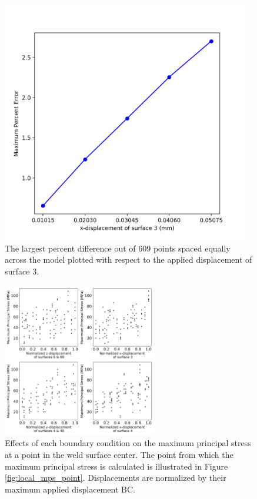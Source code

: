 \begin{figure}[h!]
\centering
\includegraphics[width=0.65\textheight,height=300pt,keepaspectratio]{nl_sload_error.png}
\caption{The largest percent difference out of 609 points spaced equally across
the model plotted with respect to the applied displacement of surface 3.}
\label{fig:nl_sload_error}
\end{figure}

\begin{figure}[h!]
\centering
\includegraphics[width=0.6\textwidth,keepaspectratio]{MPS_vs_rstl.png}
\caption{Effects of each boundary condition on the maximum principal stress at a
point in the weld surface center. The point from which the maximum
principal stress is calculated is illustrated in Figure
\ref{fig:local_mps_point}. Displacements are normalized by their maximum applied
displacement BC.
}
\label{fig:mps_vs_rstl}
\end{figure}

